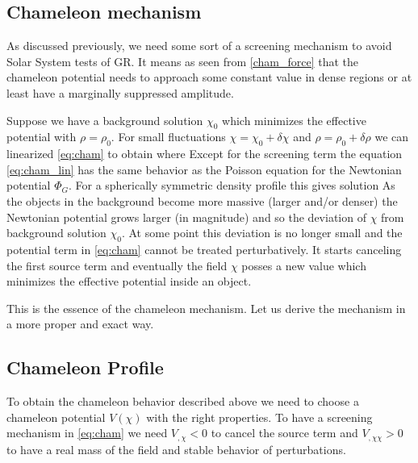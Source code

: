 \subsection{Chameleon mechanism}
As discussed previously, we need some sort of a screening mechanism to avoid Solar System tests of GR. It means as seen from \eqref{cham_force} that the chameleon potential needs to approach some constant value in dense regions or at least have a marginally suppressed amplitude.

Suppose we have a background solution $\chi_0$ which minimizes the effective potential with $\rho=\rho_0$. For small fluctuations $\chi=\chi_0+\delta\chi$ and $\rho=\rho_0+\delta\rho$ we can linearized \eqref{eq:cham} to obtain
where
Except for the screening term the equation \eqref{eq:cham_lin} has the same behavior as the Poisson equation for the Newtonian potential $\Phi_G$. For a spherically symmetric density profile this gives solution
As the objects in the background become more massive (larger and/or denser) the Newtonian potential grows larger (in magnitude) and so the deviation of $\chi$ from background solution $\chi_0$. At some point this deviation is no longer small and the potential term in \eqref{eq:cham} cannot be treated perturbatively. It starts canceling the first source term and eventually the field $\chi$ posses a new value which minimizes the effective potential inside an object.

This is the essence of the chameleon mechanism. Let us derive the mechanism in a more proper and exact way.
\subsection{Chameleon Profile}
\label{cham_prof}
To obtain the chameleon behavior described above we need to choose a chameleon potential $V(\chi)$ with the right properties. To have a screening mechanism in \eqref{eq:cham} we need $V_{,\chi}<0$ to cancel the source term and $V_{,\chi\chi}>0$ to have a real mass of the field and stable behavior of perturbations.

